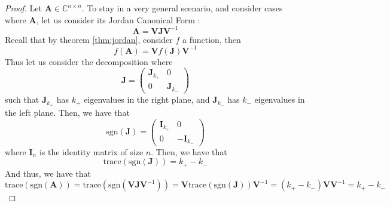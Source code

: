 \documentclass[11pt]{article}
\begin{document}
\begin{proof}
    Let $\mathbf{A}\in\mathbb{C}^{n\times n}$. To stay in a very general scenario, and consider cases where $\mathbf{A}$, let us consider its Jordan Canonical Form :
    \begin{equation*}
        \mathbf{A} = \mathbf{VJV}^{-1}
    \end{equation*} 
    Recall that by theorem \ref{thm:jordan}, consider $f$ a function, then 
    \begin{equation*}
        f(\mathbf{A}) = \mathbf{V}f(\mathbf{J})\mathbf{V}^{-1}
    \end{equation*}
    Thus let us consider the decomposition where 
    \begin{equation*}
        \mathbf{J} = \begin{pmatrix}
            \mathbf{J}_{k_+} & 0 \\ 0 & \mathbf{J}_{k_-}
        \end{pmatrix}
    \end{equation*}
    such that $\mathbf{J}_{k_+}$ has $k_+$ eigenvalues in the right plane, and $\mathbf{J}_{k_-}$ has $k_-$ eigenvalues in the left plane. Then, we have that
    \begin{equation*}
        \text{sgn}(\mathbf{J}) = \begin{pmatrix}
            \mathbf{I}_{k_+} & 0 \\ 0 & -\mathbf{I}_{k_-}
        \end{pmatrix}
    \end{equation*}
    where $\mathbf{I}_n$ is the identity matrix of size $n$. Then, we have that
    \begin{equation*}
        \text{trace}(\text{sgn}(\mathbf{J})) = k_+ - k_-
    \end{equation*}
    And thus, we have that
    \begin{equation*}
        \text{trace}(\text{sgn}(\mathbf{A})) = \text{trace}(\text{sgn}(\mathbf{VJV}^{-1})) = \mathbf{V}\text{trace}(\text{sgn}(\mathbf{J}))\mathbf{V}^{-1} = (k_+-k_-)\mathbf{V}\mathbf{V}^{-1} = k_+ - k_-
    \end{equation*}
\end{proof}
\printbibliography
\end{document}
